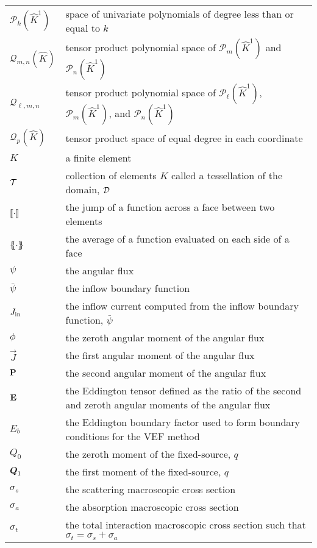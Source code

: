 \documentclass[../doc.tex]{subfiles}
\begin{document}
\begin{longtable}{p{2cm}p{12cm}}
$\mathcal{P}_k(\hat{K}^1)$ & space of univariate polynomials of degree less than or equal to $k$ \\
$\mathcal{Q}_{m,n}(\hat{K})$ & tensor product polynomial space of $\mathcal{P}_m(\hat{K}^1)$ and $\mathcal{P}_n(\hat{K}^1)$ \\
$\mathcal{Q}_{\ell,m,n}$ & tensor product polynomial space of $\mathcal{P}_\ell(\hat{K}^1)$, $\mathcal{P}_m(\hat{K}^1)$, and $\mathcal{P}_n(\hat{K}^1)$ \\
$\mathcal{Q}_p(\hat{K})$ & tensor product space of equal degree in each coordinate \\ 
$K$ & a finite element \\
$\meshT$ & collection of elements $K$ called a tessellation of the domain, $\D$ \\
$\jump{\cdot}$ & the jump of a function across a face between two elements \\
$\avg{\cdot}$ & the average of a function evaluated on each side of a face \\

$\psi$ & the angular flux \\
$\bar{\psi}$ & the inflow boundary function \\
$\Jin$ & the inflow current computed from the inflow boundary function, $\bar{\psi}$ \\
$\phi$ & the zeroth angular moment of the angular flux \\
$\vec{J}$ & the first angular moment of the angular flux \\
$\P$ & the second angular moment of the angular flux \\
$\E$ & the Eddington tensor defined as the ratio of the second and zeroth angular moments of the angular flux \\
$E_b$ & the Eddington boundary factor used to form boundary conditions for the VEF method \\
$Q_0$ & the zeroth moment of the fixed-source, $q$ \\
$\Qone$ & the first moment of the fixed-source, $q$ \\
$\sigma_s$ & the scattering macroscopic cross section \\
$\sigma_a$ & the absorption macroscopic cross section \\
$\sigma_t$ & the total interaction macroscopic cross section such that $\sigma_t = \sigma_s + \sigma_a$ \\ 
\end{longtable}
\end{document}
